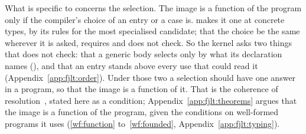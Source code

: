 What is specific to \Cpp{} concerns the selection.
The image is a function of the program only if the compiler's choice of an entry or a case is.
\Cpp{} makes it one at concrete types, by its rules for the most specialised candidate; that the choice be the same wherever it is asked, \Cpp{} requires and does not check.
So the kernel asks two things that \Cpp{} does not check: that a generic body selects only by what its declaration names (\RuleTwo{}), and that an entry stands above every use that could read it (Appendix~\ref{app:fjlt:order}).
Under those two a selection should have one answer in a program, so that the image is a function of it.
That is the coherence of resolution~\cite{jones1994qualified}, stated here as a condition; Appendix~\ref{app:fjlt:theorems} argues that the image is a function of the program, given the conditions on well-formed programs it uses (\ref{wf:function} to~\ref{wf:founded}, Appendix~\ref{app:fjlt:typing}).
